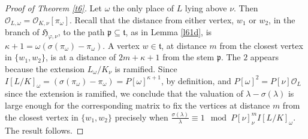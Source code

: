 \documentclass{article}
\theoremstyle{definition}
\theoremstyle{remark}
\begin{document}
\begin{proof}[Proof of Theorem \ref{t6}]
Let $\omega$ the only place of $L$ lying above $\nu$. Then
$\mathcal{O}_{L,\omega}=\mathcal{O}_{K,\nu}[\pi_\omega]$.
Recall that the distance from either vertex, $w_1$ 
or $w_2$, in the
branch of $\mathfrak{H}_{\varphi,\nu}$, to the path
$\mathfrak{p}\subseteq\mathfrak{t}$, as in Lemma
\ref{l61d}, is $\kappa+1=\omega\left(\sigma(\pi_\omega)-\pi_\omega\right)$.
A vertex $w\in\mathfrak{t}$,
at distance $m$ from the closest vertex in
$\{w_1,w_2\}$, is at a distance of
$2m+\kappa+1$
from the stem $\mathfrak{p}$. The $2$ appears because the 
extension $L_\omega/K_\nu$ is ramified.
Since $I[L/K]_\omega=
\left(\sigma(\pi_\omega)-\pi_\omega\right)=
P[\omega]^{\kappa+1}$,
by definition, and $P[\omega]^2=P[\nu]\mathcal{O}_L$
since the extension is ramified, we conclude
that the valuation of $\lambda-\sigma(\lambda)$
is large enough for the corresponding matrix
to fix the vertices at distance $m$ from
the closest vertex in $\{w_1,w_2\}$ precisely when
$\frac{\sigma(\lambda)}{\lambda}\equiv1\mod 
P[\nu]_\nu^mI[L/K]_\omega$.
The result follows.
\end{proof}
\end{document}
